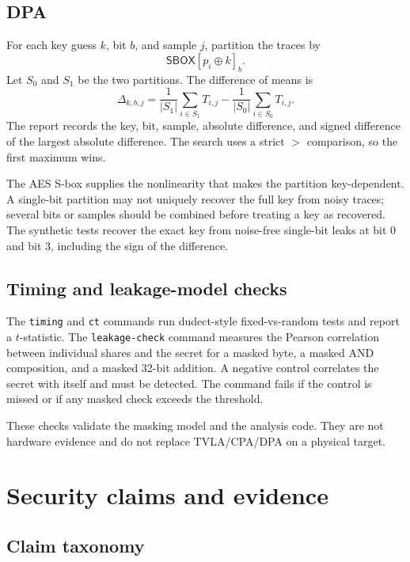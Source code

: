 \documentclass[11pt,a4paper]{article}
\newcommand{\Sbox}{\mathsf{SBOX}}
\newcommand{\code}[1]{\texttt{#1}}
\theoremstyle{plain}
\theoremstyle{definition}
\theoremstyle{remark}
\begin{document}
\subsection{DPA}

For each key guess \(k\), bit \(b\), and sample \(j\), partition the traces by
\[
  \Sbox[p_i\oplus k]_b.
\]
Let \(S_0\) and \(S_1\) be the two partitions. The difference of means is
\[
  \Delta_{k,b,j} =
  \frac{1}{|S_1|}\sum_{i\in S_1}T_{i,j}
  -
  \frac{1}{|S_0|}\sum_{i\in S_0}T_{i,j}.
\]
The report records the key, bit, sample, absolute difference, and signed difference of
the largest absolute difference. The search uses a strict \(>\) comparison, so the
first maximum wins.

The AES S-box supplies the nonlinearity that makes the partition key-dependent. A
single-bit partition may not uniquely recover the full key from noisy traces; several
bits or samples should be combined before treating a key as recovered. The synthetic
tests recover the exact key from noise-free single-bit leaks at bit 0 and bit 3,
including the sign of the difference.

\subsection{Timing and leakage-model checks}

The \code{timing} and \code{ct} commands run dudect-style fixed-vs-random tests
\citep{reparaz2017dudect} and report a \(t\)-statistic. The \code{leakage-check}
command measures the Pearson correlation between individual shares and the secret for
a masked byte, a masked AND composition, and a masked 32-bit addition. A negative
control correlates the secret with itself and must be detected. The command fails if
the control is missed or if any masked check exceeds the threshold.

These checks validate the masking model and the analysis code. They are not hardware
evidence and do not replace TVLA/CPA/DPA on a physical target.

\section{Security claims and evidence}\label{sec:claims}

\subsection{Claim taxonomy}
\end{document}
